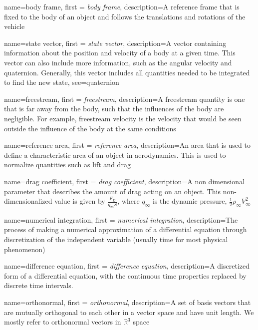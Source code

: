{
    name=body frame,
    first = {\textit{body frame}},
    description={A reference frame that is fixed to the body of an object and follows the translations and rotations of the vehicle}
}

{
    name=state vector,
    first = {\textit{state vector}},
    description={A vector containing information about the position and velocity of a body at a given time. This vector can also include more information, such as the angular velocity and quaternion. Generally, this vector includes all quantities needed to be integrated to find the new state},
    see={quaternion}
}

{
    name=freestream,
    first = {\textit{freestream}},
    description={A freestream quantity is one that is far away from the body, such that the influences of the body are negligible. For example, \gls{freestream} velocity is the velocity that would be seen outside the influence of the body at the same conditions}
}


{
    name=reference area,
    first = \textit{reference area},
    description={An area that is used to define a characteristic area of an object in aerodynamics. This is used to normalize quantities such as lift and drag}
    }

{
    name=drag coefficient,
    first = \textit{drag coefficient},
    description={A non dimensional parameter that describes the amount of drag acting on an object. This non-dimensionalized value is given by $\frac{F_D}{q_{\infty}S}$, where $q_{\infty}$ is the dynamic pressure, $\frac{1}{2}\rho_{\infty}V_{\infty}^2$}
    }

    
{
    name=numerical integration,
    first = {\textit{numerical integration}},
    description={The process of making a numerical approximation of a differential equation through discretization of the independent variable (usually time for most physical phenomenon)}
}

{
    name=difference equation,
    first = {\textit{difference equation}},
    description={A discretized form of a differential equation, with the continuous time properties replaced by discrete time intervals.}
}

{
    name=orthonormal,
    first = {\textit{orthonormal}},
    description={A set of basis vectors that are mutually orthogonal to each other in a vector space and have unit length. We mostly refer to orthonormal vectors in $\mathbb{R}^3$ space}
}

